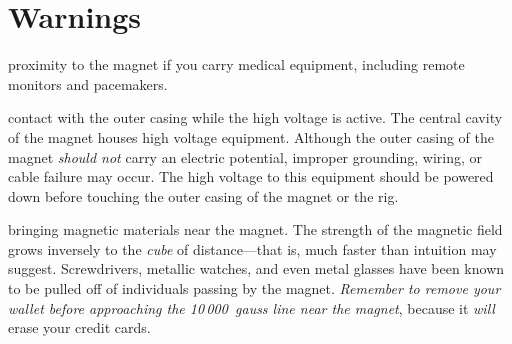 \section{Warnings}
\label{sec:eq_magnet}


\begin{avoid} proximity to the magnet if you carry medical equipment, including remote monitors and pacemakers.\end{avoid}

\begin{avoid} contact with the outer casing while the high voltage is active.  The central cavity of the magnet houses high voltage equipment.  Although the outer casing of the magnet \textit{should not} carry an electric potential, improper grounding, wiring, or cable failure may occur.  The high voltage to this equipment should be powered down before touching the outer casing of the magnet or the rig.\end{avoid}

\begin{avoid} bringing magnetic materials near the magnet.  The strength of the magnetic field grows inversely to the \textit{cube} of distance---that is, much faster than intuition may suggest.  Screwdrivers, metallic watches, and even metal glasses have been known to be pulled off of individuals passing by the magnet.  \textit{Remember to remove your wallet before approaching the 10\,000~gauss line near the magnet}, because it \textit{will} erase your credit cards.\end{avoid}


